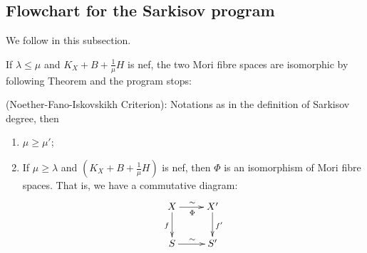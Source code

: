 \subsection{Flowchart for the Sarkisov program}
We follow \cite[\S1]{brunoLogSarkisovProgram1995} in this subsection.

If $ \lambda\leqslant\mu $ and $ K_X+B+\frac{1}{\mu}H $ is nef, the two Mori fibre spaces are isomorphic by following Theorem and the program stops:

\begin{theorem}\label{nfi}
  (Noether-Fano-Iskovskikh Criterion): Notations as in the definition of Sarkisov degree, then
  \begin{enumerate}
    \item $ \mu\geqslant \mu' $;
    \item If $ \mu \geqslant \lambda $ and $ (K_X+B+\frac{1}{\mu} H) $ is nef, then $\Phi$ is an isomorphism of Mori fibre spaces. That is, we have a commutative diagram:
          \[ \xymatrix{
              X\ar[r]^\sim_\Phi\ar[d]_f&X'\ar[d]^{f'}\\
              S\ar[r]^\sim& S' } \]
  \end{enumerate}
\end{theorem}

